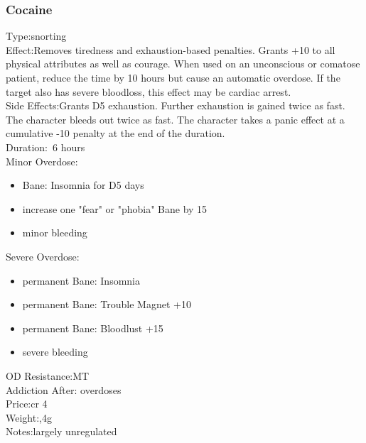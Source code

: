 \subsubsection{Cocaine}
Type:\tab snorting\\
Effect:\tab Removes tiredness and exhaustion-based penalties. Grants +10 to all physical attributes as well as courage.
When used on an unconscious or comatose patient, reduce the time by 10 hours but cause an automatic overdose. If the target also has severe bloodloss, this effect may be cardiac arrest.\\
Side Effects:\tab Grants D5 exhaustion. Further exhaustion is gained twice as fast. The character bleeds out twice as fast. The character takes a panic effect at a cumulative -10 penalty at the end of the duration.\\
Duration:\tab ~6 hours\\
Minor Overdose:\\
\begin{itemize}
	\setlength\itemsep{-8mm}
	\vspace{-12mm}
	\item Bane: Insomnia for D5 days
	\item increase one "fear" or "phobia" Bane by 15
	\item minor bleeding
\end{itemize}
Severe Overdose:\\
\begin{itemize}
	\setlength\itemsep{-8mm}
	\vspace{-12mm}
	\item permanent Bane: Insomnia
	\item permanent Bane: Trouble Magnet +10
	\item permanent Bane: Bloodlust +15
	\item severe bleeding
\end{itemize}
OD Resistance:\tab MT\\
Addiction After: overdoses\\
Price:\tab cr 4\\
Weight:,4g\\
Notes:\tab largely unregulated


